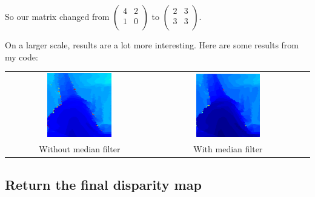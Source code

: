 \documentclass[11pt,fleqn]{article}
\begin{document}
So our matrix changed from $\left(\begin{array}{cc}
4 & 2 \\
1 & 0 \\
\end{array} \right)$ to $\left(\begin{array}{cc}
2 & 3 \\
3 & 3 \\
\end{array} \right)$.

On a larger scale, results are a lot more interesting. Here are some results from my code:\\

\begin{tabular}{ccc}
\includegraphics[width=0.456\textwidth]{images/withoutmedianfilter.png} &
\includegraphics[width=0.456\textwidth]{images/withmedianfilter.png}\\[2pt]
Without median filter & With median filter \\
\end{tabular}

\subsection{Return the final disparity map}
\end{document}
